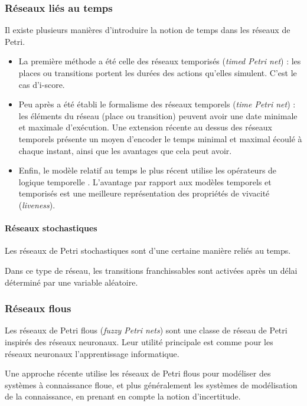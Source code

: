 \subsubsection{Réseaux liés au temps}
Il existe plusieurs manières d'introduire la notion de temps dans les réseaux de Petri.
\begin{itemize}
\item La première méthode a été celle des réseaux temporisés (\textit{timed Petri net}) : les places ou transitions portent les durées des actions qu'elles simulent. C'est le cas d'i-score.

\item Peu après a été établi le formalisme des réseaux temporels (\textit{time Petri net}) : les éléments du réseau (place ou transition) peuvent avoir une date minimale et maximale d'exécution.
Une extension récente \cite{klai2013temporal} au dessus des réseaux temporels  présente un moyen d'encoder le temps minimal et maximal écoulé à chaque instant, ainsi que les avantages que cela peut avoir.

\item Enfin, le modèle relatif au temps le plus récent utilise les opérateurs de logique temporelle \cite{logic2002temporal,suzuki1989temporal}. L'avantage par rapport aux modèles temporels et temporisés est une meilleure représentation des propriétés de vivacité (\textit{liveness}).
\end{itemize}
\paragraph{Réseaux stochastiques}
Les réseaux de Petri stochastiques \cite{bause1996stochastic} sont d'une certaine manière reliés au temps.

Dans ce type de réseau, les transitions franchissables sont activées après un délai déterminé par une variable aléatoire.
 
\subsubsection{Réseaux flous}
Les réseaux de Petri flous (\textit{fuzzy Petri nets}) \cite{pedrycz1994generalized} sont une classe de réseau de Petri inspirés des réseaux neuronaux. Leur utilité principale est comme pour les réseaux neuronaux l'apprentissage informatique.

Une approche récente utilise les réseaux de Petri flous pour modéliser des systèmes à connaissance floue\cite{wang2014dynamic}, et plus généralement les systèmes de modélisation de la connaissance, en prenant en compte la notion d'incertitude.

